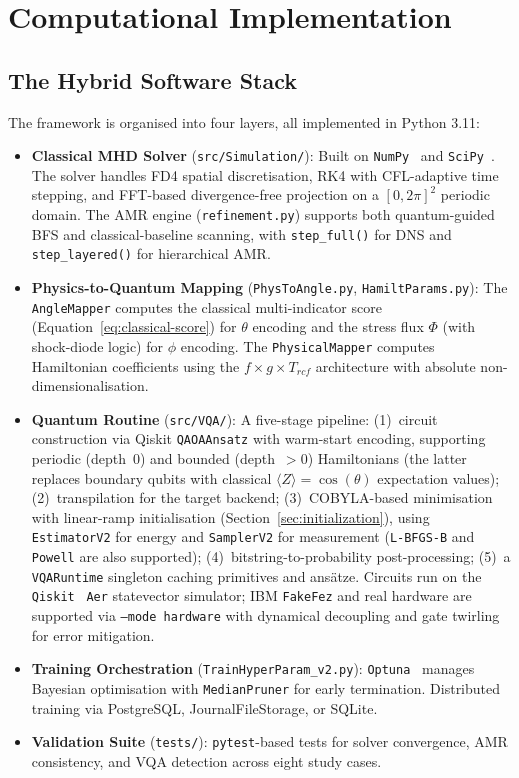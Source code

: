 \documentclass[12pt, a4paper, oneside]{report}
\begin{document}
\chapter{Computational Implementation}
\label{chap:implementation}

\section{The Hybrid Software Stack}
The framework is organised into four layers, all implemented in Python 3.11:
\begin{itemize}
    \item \textbf{Classical MHD Solver} (\texttt{src/Simulation/}): Built on \texttt{NumPy}~\cite{numpy2020} and \texttt{SciPy}~\cite{scipy2020}. The solver handles FD4 spatial discretisation, RK4 with CFL-adaptive time stepping, and FFT-based divergence-free projection on a $[0, 2\pi]^2$ periodic domain. The AMR engine (\texttt{refinement.py}) supports both quantum-guided BFS and classical-baseline scanning, with \texttt{step\_full()} for DNS and \texttt{step\_layered()} for hierarchical AMR.
    \item \textbf{Physics-to-Quantum Mapping} (\texttt{PhysToAngle.py}, \texttt{HamiltParams.py}): The \texttt{AngleMapper} computes the classical multi-indicator score (Equation~\ref{eq:classical-score}) for $\theta$ encoding and the stress flux $\Phi$ (with shock-diode logic) for $\phi$ encoding. The \texttt{PhysicalMapper} computes Hamiltonian coefficients using the $f \times g \times T_{rcf}$ architecture with absolute non-dimensionalisation.
    \item \textbf{Quantum Routine} (\texttt{src/VQA/}): A five-stage pipeline: (1)~circuit construction via Qiskit \texttt{QAOAAnsatz} with warm-start encoding, supporting periodic (depth~0) and bounded (depth~$>0$) Hamiltonians (the latter replaces boundary qubits with classical $\langle Z\rangle = \cos(\theta)$ expectation values); (2)~transpilation for the target backend; (3)~COBYLA-based minimisation with linear-ramp initialisation (Section~\ref{sec:initialization}), using \texttt{EstimatorV2} for energy and \texttt{SamplerV2} for measurement (\texttt{L-BFGS-B} and \texttt{Powell} are also supported); (4)~bitstring-to-probability post-processing; (5)~a \texttt{VQARuntime} singleton caching primitives and ansätze. Circuits run on the \texttt{Qiskit}~\cite{qiskit2024} \texttt{Aer} statevector simulator; IBM \texttt{FakeFez} and real hardware are supported via \texttt{--mode hardware} with dynamical decoupling and gate twirling for error mitigation.
    \item \textbf{Training Orchestration} (\texttt{TrainHyperParam\_v2.py}): \texttt{Optuna}~\cite{akiba2019} manages Bayesian optimisation with \texttt{MedianPruner} for early termination. Distributed training via PostgreSQL, JournalFileStorage, or SQLite.
    \item \textbf{Validation Suite} (\texttt{tests/}): \texttt{pytest}-based tests for solver convergence, AMR consistency, and VQA detection across eight study cases.
\end{itemize}
\end{document}
